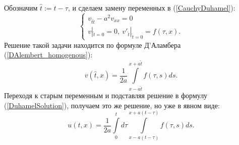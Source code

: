     Обозначим $\hat{t} := t - \tau$, и сделаем замену переменных в (\ref{CauchyDuhamel}):
    \begin{equation*}
        \begin{cases}
            v_{\hat{t}\hat{t}} - a^2 v_{xx} = 0\\
            v|_{\hat{t} = 0} = 0,\: v'_{\hat{t}}|_{\hat{t} = 0} = f(\tau, x).
        \end{cases}
    \end{equation*}
    Решение такой задачи находится по формуле Д'Аламбера (\ref{DAlembert_homogenous}):
    \begin{equation*}
        v(\hat{t}, x) = \frac{1}{2a} \int\limits_{x - a\hat{t}}^{x + a\hat{t}} f(\tau, s) ds.
    \end{equation*}
    Переходя к старым переменным и подставляя решение в формулу (\ref{DuhamelSolution}), получаем это же решение, но уже в явном виде:
    \begin{equation*}
        u(t,x) = \frac{1}{2a} \int\limits_0^t d\tau \int \limits_{x - a(t - \tau)}^{x + a(t - \tau)} f(\tau, s) ds.
    \end{equation*}
